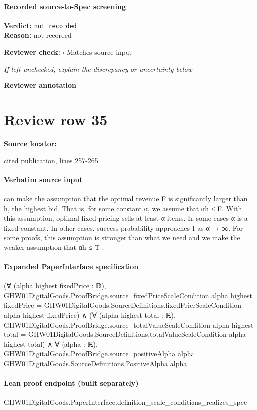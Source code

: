 \documentclass[10pt]{article}
\newcommand{\reviewerbox}{%
  \par\noindent\fbox{\parbox{0.96\linewidth}{\rule{0pt}{0.38in}}}\par
}
\newcommand{\reviewmatch}[1]{%
  \par\noindent\textbf{Reviewer check:} $\square$\; #1\par
  \noindent\emph{If left unchecked, explain the discrepancy or uncertainty below.}\par
}
\begin{document}
\paragraph{Recorded source-to-Spec screening}
\textbf{Verdict:} \texttt{not recorded}
\\
\textbf{Reason:} not recorded
\reviewmatch{Matches source input}
\noindent\textbf{Reviewer annotation}\par
\reviewerbox
\clearpage
\hypertarget{source-claim-063516640731ad8f}{}
\section*{Review row 35}
\textbf{Source locator:} {\footnotesize\raggedright cited publication, lines 257-\allowbreak{}265\par}
\paragraph{Verbatim source input}
\begin{ReviewVerbatim}
can make the assumption that the optimal revenue F
is significantly larger than h, the highest bid. That
is, for some constant α, we assume that αh ≤ F.
With this assumption, optimal fixed pricing sells at
least α items. In some cases α is a fixed constant. In
other cases, success probability approaches 1 as α →
∞. For some proofs, this assumption is stronger than
what we need and we make the weaker assumption
that αh ≤ T .
\end{ReviewVerbatim}


\paragraph{Expanded PaperInterface specification}
\begin{ReviewVerbatim}
(∀ (alpha highest fixedPrice : ℝ),
    GHW01DigitalGoods.ProofBridge.source_fixedPriceScaleCondition alpha highest fixedPrice =
      GHW01DigitalGoods.SourceDefinitions.fixedPriceScaleCondition alpha highest fixedPrice) ∧
  (∀ (alpha highest total : ℝ),
      GHW01DigitalGoods.ProofBridge.source_totalValueScaleCondition alpha highest total =
        GHW01DigitalGoods.SourceDefinitions.totalValueScaleCondition alpha highest total) ∧
    ∀ (alpha : ℝ),
      GHW01DigitalGoods.ProofBridge.source_positiveAlpha alpha = GHW01DigitalGoods.SourceDefinitions.PositiveAlpha alpha
\end{ReviewVerbatim}

\paragraph{Lean proof endpoint (built separately)}\begin{ReviewVerbatim}
GHW01DigitalGoods.PaperInterface.definition_scale_conditions_realizes_spec
\end{ReviewVerbatim}
\end{document}
